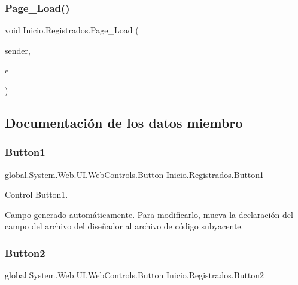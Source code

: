 \subsubsection{\texorpdfstring{Page\_Load()}{Page\_Load()}}
{\footnotesize\ttfamily void Inicio.\+Registrados.\+Page\+\_\+\+Load (\begin{DoxyParamCaption}\item[{object}]{sender,  }\item[{Event\+Args}]{e }\end{DoxyParamCaption})\hspace{0.3cm}{\ttfamily [protected]}}



\subsection{Documentación de los datos miembro}
\mbox{\label{classInicio_1_1Registrados_acef829ede3774fe5a9e0cf940d35e6ef}} 
\subsubsection{\texorpdfstring{Button1}{Button1}}
{\footnotesize\ttfamily global.\+System.\+Web.\+U\+I.\+Web\+Controls.\+Button Inicio.\+Registrados.\+Button1\hspace{0.3cm}{\ttfamily [protected]}}



Control Button1. 

Campo generado automáticamente. Para modificarlo, mueva la declaración del campo del archivo del diseñador al archivo de código subyacente. \mbox{\label{classInicio_1_1Registrados_a92bb41484c2ad0de40bf04ea1ad2c868}} 
\subsubsection{\texorpdfstring{Button2}{Button2}}
{\footnotesize\ttfamily global.\+System.\+Web.\+U\+I.\+Web\+Controls.\+Button Inicio.\+Registrados.\+Button2\hspace{0.3cm}{\ttfamily [protected]}}



